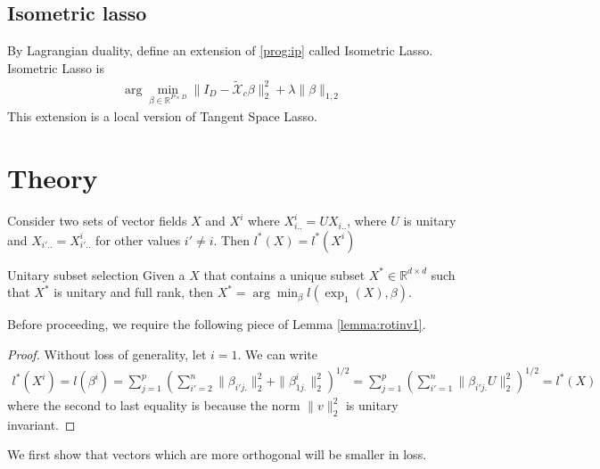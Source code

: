 \documentclass[a4paper,11pt]{article}
\begin{document}
\subsection{Isometric lasso}

By Lagrangian duality, define an extension of \ref{prog:ip} called Isometric Lasso.
Isometric Lasso is
\begin{align}
\arg \min_{\beta \in \mathbb R^{P \times D}} \|I_D -  \tilde{ \mathcal X}_c \beta\|_2^2 +  \lambda \| \beta \|_{1,2}
\end{align}
This extension is a local version of Tangent Space Lasso.

\section{Theory}
\label{sec:theory}
 \begin{proposition}
 \label{prop:unitarybasis}
Consider two sets of vector fields $X$ and $X^i$ where $X_{i..}^i = U X_{i..} $, where $U$ is unitary and $X_{i'..} = X_{i'..}^i$ for other values $i' \neq i$.
Then $l^*(X) = l^*(X^i)$
\end{proposition}

\begin{proposition}{Unitary subset selection}
Given a $X$ that contains a unique subset $X^* \in \mathbb R^{d \times d} $ such that $X^*$ is unitary and full rank, then $X^* = \arg \min_\beta l(\exp_1(X),\beta)$.
\end{proposition}


Before proceeding, we require the following piece of Lemma \ref{lemma:rotinv1}. 


\begin{proof}
Without loss of generality, let $i = 1$.
We can write 
\begin{eqnarray}
l^*(X^i) = l(\beta^i) = \sum_{j = 1}^p (\sum_{i'=2}^n \| \beta_{i'j.} \|_2^2 +  \|  \beta_{1j.}^i \|_2^2 )^{1/2}=  \sum_{j = 1}^p (\sum_{i'=1}^n \| \beta_{i'j.} U \|_2^2)^{1/2} = l^*(X)
\end{eqnarray}
where the second to last equality is because the norm $\|v\|_2^2 $ is unitary invariant.
\end{proof}

We first show that vectors which are more orthogonal will be smaller in loss.
\end{document}
